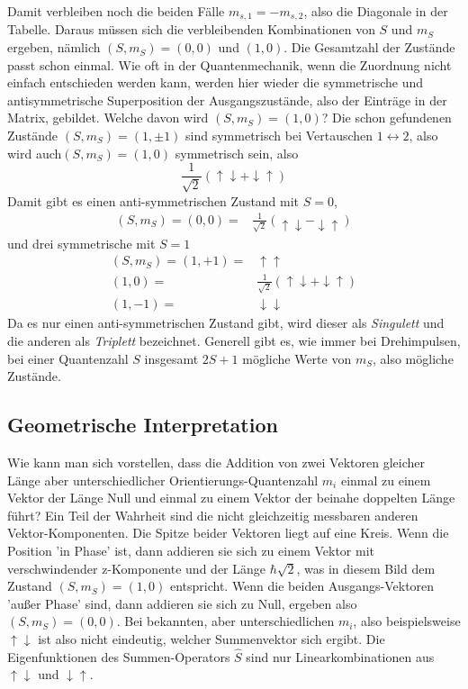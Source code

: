 Damit verbleiben noch die beiden Fälle $m_{s,1} = - m_{s,2}$, also die Diagonale in der Tabelle. Daraus müssen sich die verbleibenden Kombinationen von $S$ und $m_S$ ergeben, nämlich $(S, m_S) = (0,0)$ und $(1,0)$. Die Gesamtzahl der Zustände passt schon einmal. Wie oft in der Quantenmechanik, wenn die Zuordnung nicht einfach entschieden werden kann, werden hier wieder die symmetrische und antisymmetrische Superposition der Ausgangszustände, also der Einträge in der Matrix, gebildet. Welche davon wird  $(S, m_S) = (1,0)$? Die schon gefundenen Zustände $(S, m_S) = (1,\pm1) $ sind symmetrisch bei Vertauschen $1 \leftrightarrow 2$, also wird auch$(S, m_S) = (1,0)$ symmetrisch sein, also 
\begin{equation}
   \frac{1}{\sqrt{2}} \left(  \uparrow \downarrow  +  \downarrow \uparrow \right)
\end{equation}
Damit gibt es einen anti-symmetrischen Zustand mit $S = 0$, 
\begin{align}
    (S, m_S) = (0, 0)  = & \frac{1}{\sqrt{2}} \left(  \uparrow \downarrow -  \downarrow \uparrow \right) 
\end{align}
und drei symmetrische mit $S=1$
\begin{align}
    (S, m_S) =  (1, +1) =& \uparrow \uparrow  \\
  (1, 0) = & \frac{1}{\sqrt{2}} \left( \uparrow \downarrow +  \downarrow \uparrow \right) \\
  (1, -1) = &\downarrow \downarrow  
\end{align}
Da es nur einen anti-symmetrischen Zustand gibt, wird dieser als \emph{Singulett} und die anderen als \emph{Triplett} bezeichnet. Generell gibt es, wie immer bei Drehimpulsen, bei einer Quantenzahl $S$ insgesamt $2S+1$ mögliche Werte von $m_S$, also mögliche Zustände.

\subsection{Geometrische Interpretation}

Wie kann man sich vorstellen, dass die Addition von zwei Vektoren gleicher Länge aber unterschiedlicher Orientierungs-Quantenzahl $m_i$ einmal zu einem Vektor der Länge Null und einmal zu einem Vektor der beinahe doppelten Länge führt? Ein Teil der Wahrheit sind die nicht gleichzeitig messbaren anderen Vektor-Komponenten. Die Spitze beider Vektoren liegt auf eine Kreis. Wenn die Position 'in Phase' ist, dann addieren sie sich zu einem Vektor mit verschwindender z-Komponente und der Länge $\hbar \sqrt{2}$, was in diesem Bild dem Zustand $(S, m_S) = (1,0)$ entspricht. Wenn die beiden Ausgangs-Vektoren 'außer Phase' sind, dann addieren sie sich zu Null, ergeben also  $(S, m_S) = (0,0)$. Bei bekannten, aber unterschiedlichen $m_i$, also beispielsweise $\uparrow \downarrow$ ist also nicht eindeutig, welcher Summenvektor sich ergibt. Die Eigenfunktionen des Summen-Operators $\hat{S}$ sind nur Linearkombinationen aus $\uparrow \downarrow$ und $\downarrow \uparrow$.

